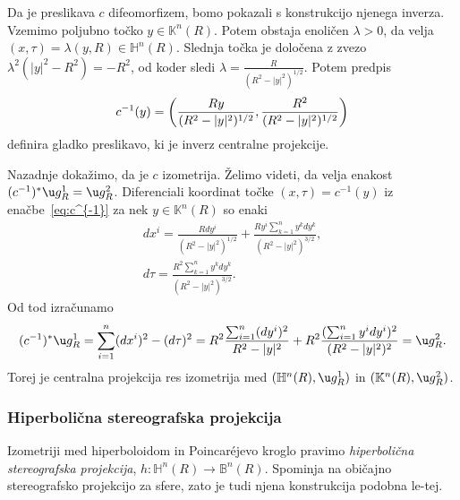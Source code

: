 \documentclass[a4paper]{article}
\begin{document}
Da je preslikava $c$ difeomorfizem, bomo pokazali s konstrukcijo njenega inverza.
Vzemimo poljubno točko $y \in \mathbb{K}^{n}(R)$. Potem obstaja enoličen $\lambda>0$, da velja $(x, \tau) = \lambda (y,R) \in \mathbb{H}^{n}(R)$. Slednja točka je določena z zvezo $\lambda^2 (|y|^2-R^2)=-R^2$, od koder sledi $\lambda = \frac{R}{(R^2-|y|^2)^{1/2}}$.
Potem predpis
\begin{equation}\label{eq:c^{-1}}
c^{-1}(y) = \left( \frac{Ry}{(R^2-|y|^2)^{1/2}}, \frac{R^2}{(R^2-|y|^2)^{1/2}} \right)
\end{equation}
definira gladko preslikavo, ki je inverz centralne projekcije.

Nazadnje dokažimo, da je $c$ izometrija. Želimo videti, da velja enakost $(c^{-1})^{*} \u g_{R}^{1} = \u g_{R}^{2}$.
Diferenciali koordinat točke $(x, \tau) = c^{-1}(y)$ iz enačbe~\ref{eq:c^{-1}} za nek $y \in \mathbb{K}^{n}(R)$ so enaki
\begin{gather*}
dx^{i} = \frac{Rdy^{i}}{(R^2-|y|^2)^{1/2}} + \frac{Ry^{i} \sum_{k=1}^{n}y^{k}dy^{k}}{(R^2-|y|^2)^{3/2}}, \\
d\tau = \frac{R^2 \sum_{k=1}^{n}y^{k}dy^{k}}{(R^2-|y|^2)^{3/2}}.
\end{gather*}
Od tod izračunamo
\begin{gather*}
(c^{-1})^{*} \u g_{R}^{1} = \sum_{i=1}^{n} (dx^{i})^2 - (d\tau)^2 = R^2 \frac{\sum_{i=1}^{n}(dy^{i})^2}{R^2-|y|^2} + R^2 \frac{(\sum_{i=1}^{n}y^{i}dy^{i})^2}{(R^2-|y|^2)^2} = \u g_{R}^{2}.
\end{gather*}
Torej je centralna projekcija res izometrija med $(\mathbb{H}^{n}(R), \u g_{R}^{1})$ in $(\mathbb{K}^{n}(R), \u g_{R}^{2})$.

\subsubsection{Hiperbolična stereografska projekcija}
Izometriji med hiperboloidom in Poincar\'ejevo kroglo pravimo \emph{hiperbolična stereografska projekcija}, $h \colon \mathbb{H}^{n}(R) \to \mathbb{B}^{n}(R)$. Spominja na običajno stereografsko projekcijo za sfere, zato je tudi njena konstrukcija podobna le-tej.
\end{document}
